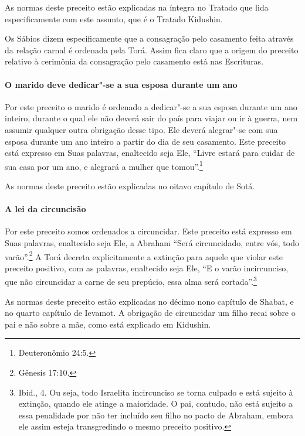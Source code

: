 \begin{multicols}{2}
As normas deste preceito estão explicadas na íntegra no Tratado que lida
especificamente com este assunto, que é o Tratado Kidushin\starr.

Os Sábios dizem especificamente que a consagração pelo casamento feita
através da relação carnal é ordenada pela Torá\starr. Assim fica claro que a
origem do preceito relativo à cerimônia da consagração pelo casamento está
nas Escrituras.

\paragraph{O marido deve dedicar"-se a sua esposa durante um ano}

Por este preceito o marido é ordenado a dedicar"-se a sua esposa durante
um ano inteiro, durante o qual ele não deverá sair do país para viajar
ou ir à guerra, nem assumir qualquer outra obrigação desse tipo. Ele
deverá alegrar"-se com sua esposa durante um ano inteiro a partir do dia
de seu casamento. Este preceito está expresso em Suas palavras,
enaltecido seja Ele, ``Livre estará para cuidar de sua casa por um ano,
e alegrará a mulher que tomou''.\footnote{Deuteronômio 24:5.}

As normas deste preceito estão explicadas no oitavo capítulo de Sotá\starr.

\paragraph{A lei da circuncisão}

Por este preceito somos ordenados a circuncidar. Este preceito está
expresso em Suas palavras, enaltecido seja Ele, a Abraham ``Será
circuncidado, entre vós, todo varão''.\footnote{Gênesis 17:10.} A Torá\starr{} decreta
explicitamente a extinção para aquele que violar este preceito
positivo, com as palavras, enaltecido seja Ele, ``E o varão
incircunciso, que não circuncidar a carne de seu prepúcio, essa alma
será cortada''.\footnote{Ibid., 4. Ou seja, todo Israelita incircunciso se torna culpado e está
sujeito à extinção, quando ele atinge a maioridade. O pai, contudo, não
está sujeito a essa penalidade por não ter incluído seu filho no pacto
de Abraham, embora ele assim esteja transgredindo o mesmo preceito
positivo.}

As normas deste preceito estão explicadas no décimo nono capítulo de
Shabat, e no quarto capítulo de Ievamot\starr. A obrigação de circuncidar um
filho recai sobre o pai e não sobre a mãe, como está explicado em
Kidushin\starr.


\end{multicols}
